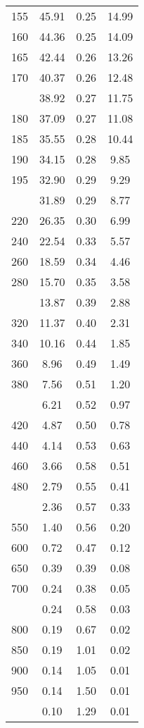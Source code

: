 \begin{table}[ht]
\begin{tabular}{lccc}
  155 & 45.91 & 0.25 & 14.99 \\ 
  160 & 44.36 & 0.25 & 14.09 \\ 
  165 & 42.44 & 0.26 & 13.26 \\ 
  170 & 40.37 & 0.26 & 12.48 \\ 
   \addlinespace
175 & 38.92 & 0.27 & 11.75 \\ 
  180 & 37.09 & 0.27 & 11.08 \\ 
  185 & 35.55 & 0.28 & 10.44 \\ 
  190 & 34.15 & 0.28 & 9.85 \\ 
  195 & 32.90 & 0.29 & 9.29 \\ 
   \addlinespace
200 & 31.89 & 0.29 & 8.77 \\ 
  220 & 26.35 & 0.30 & 6.99 \\ 
  240 & 22.54 & 0.33 & 5.57 \\ 
  260 & 18.59 & 0.34 & 4.46 \\ 
  280 & 15.70 & 0.35 & 3.58 \\ 
   \addlinespace
300 & 13.87 & 0.39 & 2.88 \\ 
  320 & 11.37 & 0.40 & 2.31 \\ 
  340 & 10.16 & 0.44 & 1.85 \\ 
  360 & 8.96 & 0.49 & 1.49 \\ 
  380 & 7.56 & 0.51 & 1.20 \\ 
   \addlinespace
400 & 6.21 & 0.52 & 0.97 \\ 
  420 & 4.87 & 0.50 & 0.78 \\ 
  440 & 4.14 & 0.53 & 0.63 \\ 
  460 & 3.66 & 0.58 & 0.51 \\ 
  480 & 2.79 & 0.55 & 0.41 \\ 
   \addlinespace
500 & 2.36 & 0.57 & 0.33 \\ 
  550 & 1.40 & 0.56 & 0.20 \\ 
  600 & 0.72 & 0.47 & 0.12 \\ 
  650 & 0.39 & 0.39 & 0.08 \\ 
  700 & 0.24 & 0.38 & 0.05 \\ 
   \addlinespace
750 & 0.24 & 0.58 & 0.03 \\ 
  800 & 0.19 & 0.67 & 0.02 \\ 
  850 & 0.19 & 1.01 & 0.02 \\ 
  900 & 0.14 & 1.05 & 0.01 \\ 
  950 & 0.14 & 1.50 & 0.01 \\ 
   \addlinespace
1000 & 0.10 & 1.29 & 0.01 \\ 
   \bottomrule
\end{tabular}
\end{table}
